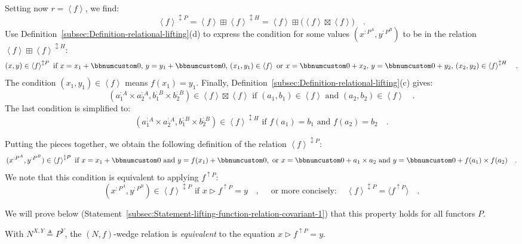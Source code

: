 Setting now $r=\left<f\right>$, we find:
\[
\left<f\right>^{\updownarrow P}=\left<f\right>\boxplus\left<f\right>^{\updownarrow H}=\left<f\right>\boxplus\big(\left<f\right>\boxtimes\left<f\right>\big)\quad.
\]
Use Definition~\ref{subsec:Definition-relational-lifting}(d) to
express the condition for some values $(x^{:P^{A}},y^{:P^{B}})$ to
be in the relation $\left<f\right>\boxplus\left<f\right>^{\updownarrow H}$:
\[
(x,y)\in\left<f\right>^{\updownarrow P}\text{ if }x=x_{1}+\bbnum 0,\,y=y_{1}+\bbnum 0,\,(x_{1},y_{1})\in\left<f\right>\text{ or }x=\bbnum 0+x_{2},\,y=\bbnum 0+y_{2},\,(x_{2},y_{2})\in\left<f\right>^{\updownarrow H}\quad.
\]
The condition $(x_{1},y_{1})\in\left<f\right>$ means $f(x_{1})=y_{1}$.
Finally, Definition~\ref{subsec:Definition-relational-lifting}(c)
gives:
\[
(a_{1}^{:A}\times a_{2}^{:A},b_{1}^{:B}\times b_{2}^{:B})\in\left<f\right>\boxtimes\left<f\right>\text{ if }(a_{1},b_{1})\in\left<f\right>\text{ and }(a_{2},b_{2})\in\left<f\right>\quad.
\]
The last condition is simplified to:
\[
(a_{1}^{:A}\times a_{2}^{:A},b_{1}^{:B}\times b_{2}^{:B})\in\left<f\right>^{\updownarrow H}\text{ if }f(a_{1})=b_{1}\text{ and }f(a_{2})=b_{2}\quad.
\]

Putting the pieces together, we obtain the following definition of
the relation $\left<f\right>^{\updownarrow P}$:
\[
(x^{:P^{A}},y^{:P^{B}})\in\left<f\right>^{\updownarrow P}\text{ if }x=x_{1}+\bbnum 0\text{ and }y=f(x_{1})+\bbnum 0,\text{ or }x=\bbnum 0+a_{1}\times a_{2}\text{ and }y=\bbnum 0+f(a_{1})\times f(a_{2})\quad.
\]
We note that this condition is equivalent to applying $f^{\uparrow P}$:
\[
(x^{:P^{A}},y^{:P^{B}})\in\left<f\right>^{\updownarrow P}\text{ if }x\triangleright f^{\uparrow P}=y\quad,\quad\text{ or more concisely}:\quad\left<f\right>^{\updownarrow P}=\langle f^{\uparrow P}\rangle\quad.
\]

We will prove below (Statement~\ref{subsec:Statement-lifting-function-relation-covariant-1})
that this property holds for all functors $P$.

With $N^{X,Y}\triangleq P^{Y}$, the $\left(N,f\right)$-wedge relation
is \emph{equivalent} to the equation $x\triangleright f^{\uparrow P}=y$.

